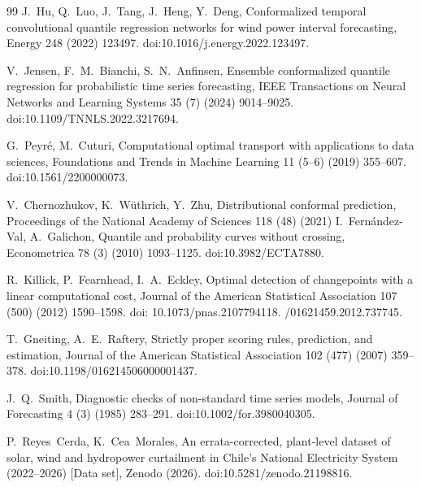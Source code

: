 \documentclass[preprint,3p,times]{elsarticle}
\providecommand{\DIFaddtex}[1]{{\protect\color{blue} \sf #1}} %
\providecommand{\DIFdeltex}[1]{{\protect\color{red} \scriptsize #1}} %
\providecommand{\DIFaddbegin}{} %
\providecommand{\DIFaddend}{} %
\providecommand{\DIFdelbegin}{} %
\providecommand{\DIFdelend}{} %
\providecommand{\DIFadd}[1]{\texorpdfstring{\DIFaddtex{#1}}{#1}} %
\providecommand{\DIFdel}[1]{\texorpdfstring{\DIFdeltex{#1}}{}} %
\begin{document}
\begin{thebibliography}{99}
\DIFadd{J.~Hu, Q.~Luo, J.~Tang, J.~Heng, Y.~Deng,
Conformalized temporal convolutional quantile regression networks for wind power interval forecasting,
Energy 248 (2022) 123497.
doi:10.1016/j.energy.2022.123497.
}

\DIFadd{V.~Jensen, F.~M.~Bianchi, S.~N.~Anfinsen,
Ensemble conformalized quantile regression for probabilistic time series forecasting,
IEEE Transactions on Neural Networks and Learning Systems 35 (7) (2024) 9014--9025.
doi:10.1109/TNNLS.2022.3217694.
}

\DIFaddend {}
G.~Peyr\'e, M.~Cuturi,
Computational optimal transport \DIFaddbegin \DIFadd{with applications to data sciences}\DIFaddend ,
Foundations and Trends in Machine Learning 11 (5--6) (2019) 355--607.
\DIFaddbegin \DIFadd{doi:10.1561/2200000073.
}\DIFaddend 

\DIFdelbegin {}
\DIFdelend \DIFaddbegin {}
\DIFaddend V.~Chernozhukov, \DIFdelbegin \DIFdel{K.~W\"uthrich, Y.~Zhu,
Distributional conformal prediction,
Proceedings of the National Academy of Sciences 118 (48) (2021) }\DIFdelend \DIFaddbegin \DIFadd{I.~Fern\'andez-Val, A.~Galichon,
Quantile and probability curves without crossing,
Econometrica 78 (3) (2010) 1093--1125.
doi:10.3982/ECTA7880}\DIFaddend .
\DIFaddbegin 

\DIFadd{R.~Killick, P.~Fearnhead, I.~A.~Eckley,
Optimal detection of changepoints with a linear computational cost,
Journal of the American Statistical Association 107 (500) (2012) 1590--1598.
}\DIFaddend doi:\DIFdelbegin \DIFdel{10.1073/pnas.2107794118.
}\DIFdelend \DIFaddbegin \DIFadd{10.1080/01621459.2012.737745.
}

\DIFadd{T.~Gneiting, A.~E.~Raftery,
Strictly proper scoring rules, prediction, and estimation,
Journal of the American Statistical Association 102 (477) (2007) 359--378.
doi:10.1198/016214506000001437.
}\DIFaddend 

J.~Q.~Smith,
Diagnostic checks of non-standard time series models,
Journal of Forecasting 4 (3) (1985) 283--291.
doi:10.1002/for.3980040305.

P.~Reyes~Cerda, K.~Cea~Morales,
An errata-corrected, plant-level dataset of solar, wind and hydropower curtailment in Chile's National Electricity System (2022--2026) [Data set],
Zenodo (2026). doi:10.5281/zenodo.21198816.

\end{thebibliography}
\end{document}
